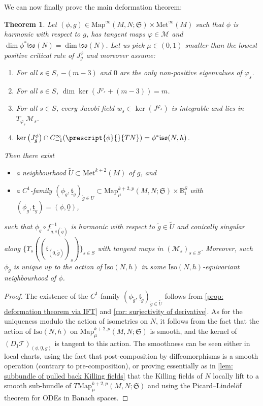 \documentclass{article}
\numberwithin{equation}{section}        %
\theoremstyle{bfnote}
\newtheorem{thm}{Theorem}[section]          %
\theoremstyle{definition}
\theoremstyle{bfremark}
\newcommand{\Ball}{\mathbb{B}}              %
\newcommand{\Map}{\mathrm{Map}}             %
\newcommand{\Met}{\mathrm{Met}}             %
\begin{document}
We can now finally prove the main deformation theorem:

\begin{thm}     \label{thm: deformation theorem with sobolev regularity}
    Let $(\phi,g) \in \Map^\infty(M,N;\mathfrak{S}) \times \Met^\infty(M)$ such that $\phi$ is harmonic with respect to $g$, has tangent maps $\underline{\varphi} \in \mathcal{M}$ and $\dim \phi^*\mathfrak{iso}(N) = \dim \mathfrak{iso}(N)$. Let us pick $\mu \in (0,1)$ smaller than the lowest positive critical rate of $J^\phi_g$ and moreover assume:
    \begin{enumerate}
        \item For all $s \in S$, $-(m-3)$ and $0$ are the only non-positive eigenvalues of $\varphi_s$.
        \item For all $s \in S$, $\dim \ker(J^{\varphi_s}+(m-3)) = m$.
        \item For all $s \in S$, every Jacobi field $w_s \in \ker(J^{\varphi_s})$ is integrable and lies in $T_{\varphi_s} \mathcal{M}_s$.
        \item $\ker\big(J^{\phi}_g\big) \cap C^{\infty}_{-1}(\prescript{\phi}{}{TN}) = \phi^*\mathfrak{iso}(N,h)$.
    \end{enumerate}
    Then there exist
    \begin{itemize}
        \item a neighbourhood $\widetilde{U} \subset \Met^{k+2}(M)$ of $g$, and
        \item a $C^1$-family $(\phi_{\tilde{g}},\underline{\mathfrak{t}}_{\tilde{g}})_{\tilde{g}\in U} \subset \Map^{k+2,p}_{\mu}(M,N;\mathfrak{S}) \times \Ball_1^S$ with $(\phi_{g},\underline{\mathfrak{t}}_{g}) = (\phi,\underline{0})$,
    \end{itemize} 
    such that $\phi_{\tilde{g}} \circ f_{\tilde{g},\underline{\mathfrak{t}}(\tilde{g})}^{-1}$ is harmonic with respect to $\tilde{g} \in \widetilde{U}$ and conically singular along $\{\Upsilon_s((\mathfrak{t}_{(0,\tilde{g})})_s)\}_{s\in S}$ with tangent maps in $(\mathcal{M}_s)_{s\in S}$. Moreover, such $\phi_{\tilde{g}}$ is unique up to the action of $\mathrm{Iso}(N,h)$ in some $\mathrm{Iso}(N,h)$-equivariant neighbourhood of $\phi$.
\end{thm}

\begin{proof}
    The existence of the $C^1$-family $(\phi_{\tilde{g}},\underline{\mathfrak{t}}_{\tilde{g}})_{\tilde{g}\in \widetilde{U}}$ follows from \cref{prop: deformation theorem via IFT} and \cref{cor: surjectivity of derivative}. As for the uniqueness modulo the action of isometries on $N$, it follows from the fact that the action of $\mathrm{Iso}(N,h)$ on $\Map^{k+2,p}_\mu(M,N;\mathfrak{S})$ is smooth, and the kernel of $(D_1 \mathcal{T})_{(\phi,\underline{0},g)}$ is tangent to this action. The smoothness can be seen either in local charts, using the fact that post-composition by diffeomorphisms is a smooth operation (contrary to pre-composition), or proving essentially as in \cref{lem: subbundle of pulled back Killing fields} that the Killing fields of $N$ locally lift to a smooth sub-bundle of $T\Map^{k+2,p}_\mu(M,N;\mathfrak{S})$ and using the Picard--Lindel\"of theorem for ODEs in Banach spaces.
\end{proof}
\end{document}
